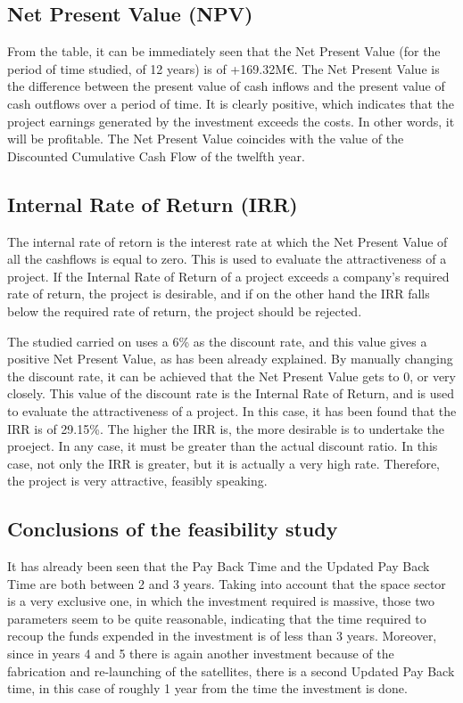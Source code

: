 \subsection{Net Present Value (NPV)}
From the table, it can be immediately seen that the Net Present Value (for the period of time studied, of 12 years) is of +169.32M\euro. The Net Present Value is the difference between the present value of cash inflows and the present value of cash outflows over a period of time. It is clearly positive, which indicates that the project earnings generated by the investment exceeds the costs. In other words, it will be profitable. The Net Present Value coincides with the value of the Discounted Cumulative Cash Flow of the twelfth year. 


\subsection{Internal Rate of Return (IRR)}
The internal rate of retorn is the interest rate at which the Net Present Value of all the cashflows is equal to zero. This is used to evaluate the attractiveness of a project. If the Internal Rate of Return of a project exceeds a company's required rate of return, the project is desirable, and if on the other hand the IRR falls below the required rate of return, the project should be rejected.

The studied carried on uses a 6\% as the discount rate, and this value gives a positive Net Present Value, as has been already explained. By manually changing the discount rate, it can be achieved that the Net Present Value gets to 0, or very closely. This value of the discount rate is the Internal Rate of Return, and is used to evaluate the attractiveness of a project. In this case, it has been found that the IRR is of 29.15\%. The higher the IRR is, the more desirable is to undertake the proeject. In any case, it must be greater than the actual discount ratio. In this case, not only the IRR is greater, but it is actually a very high rate. Therefore, the project is very attractive, feasibly speaking. 

\subsection{Conclusions of the feasibility study}
It has already been seen that the Pay Back Time and the Updated Pay Back Time are both between 2 and 3 years. Taking into account that the space sector is a very exclusive one, in which the investment required is massive, those two parameters seem to be quite reasonable, indicating that the time required to recoup the funds expended in the investment is of less than 3 years. Moreover, since in years 4 and 5 there is again another investment because of the fabrication and re-launching of the satellites, there is a second Updated Pay Back time, in this case of roughly 1 year from the time the investment is done.

